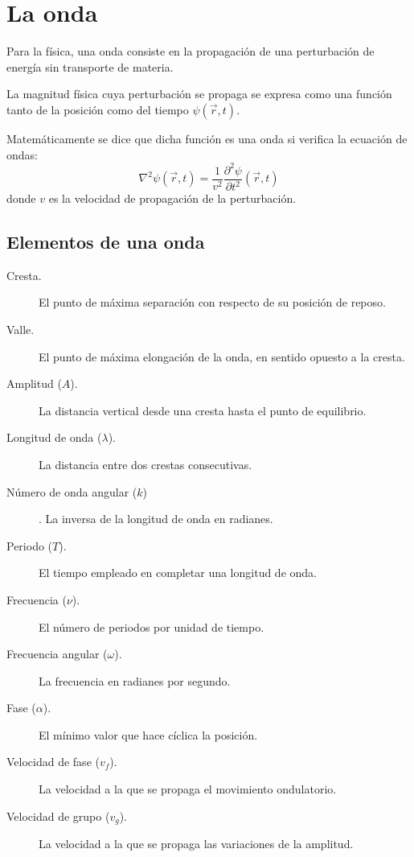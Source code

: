 \section{La onda}\label{sec:la-onda}

Para la física, una onda consiste en la propagación de una perturbación de energía sin transporte de materia.

La magnitud física cuya perturbación se propaga se expresa como una función tanto de la posición como del tiempo
$\psi(\vec{r},t)$.

Matemáticamente se dice que dicha función es una onda si verifica la ecuación de ondas:
\begin{equation}
    \label{eq:ecuacion-onda}
    \nabla^2\psi(\vec {r},t)=\frac {1}{v^2}\frac{\partial^2\psi}{\partial t^2}(\vec {r},t)
\end{equation}
donde $v$ es la velocidad de propagación de la perturbación.

\subsection{Elementos de una onda}\label{subsec:elementos-de-una-onda}

\begin{description}
    \item[Cresta.] El punto de máxima separación con respecto de su posición de reposo.
    \item[Valle.] El punto de máxima elongación de la onda, en sentido opuesto a la cresta.
    \item[Amplitud ($A$).] La distancia vertical desde una cresta hasta el punto de equilibrio.
    \item[Longitud de onda ($\lambda$).] La distancia entre dos crestas consecutivas.
    \item[Número de onda angular ($k$)]. La inversa de la longitud de onda en radianes.
    \item[Periodo ($T$).] El tiempo empleado en completar una longitud de onda.
    \item[Frecuencia ($\nu$).] El número de periodos por unidad de tiempo.
    \item[Frecuencia angular ($\omega$).] La frecuencia en radianes por segundo.
    \item[Fase ($\alpha$).] El mínimo valor que hace cíclica la posición.
    \item[Velocidad de fase ($v_f$).] La velocidad a la que se propaga el movimiento ondulatorio.
    \item[Velocidad de grupo ($v_g$).] La velocidad a la que se propaga las variaciones de la amplitud.
\end{description}

